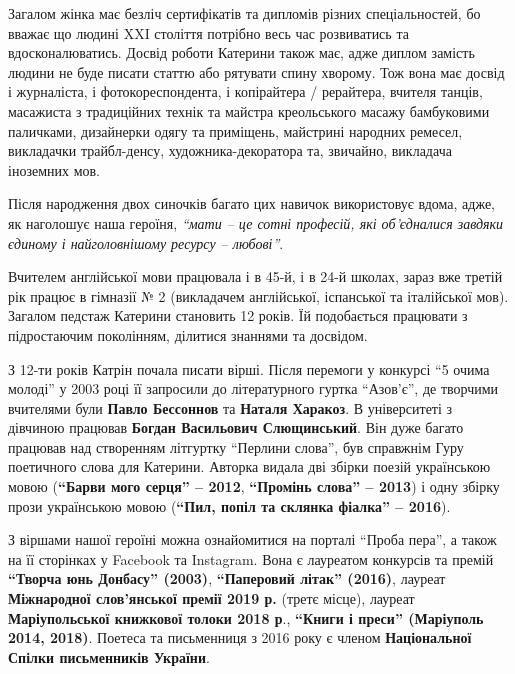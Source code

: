 
Загалом жінка має безліч сертифікатів та дипломів різних спеціальностей, бо
вважає що людині XXI століття потрібно весь час розвиватись та
вдосконалюватись. Досвід роботи Катерини також має, адже диплом замість людини
не буде писати статтю або рятувати спину хворому. Тож вона має досвід і
журналіста, і фотокореспондента, і копірайтера / рерайтера, вчителя танців,
масажиста з традиційних технік та майстра креольського масажу бамбуковими
паличками, дизайнерки одягу та приміщень, майстрині народних ремесел,
викладачки трайбл-денсу, художника-декоратора та, звичайно, викладача іноземних
мов.

Після народження двох синочків багато цих навичок використовує вдома, адже, як
наголошує наша героїня, \emph{\enquote{мати – це сотні професій, які об'єдналися завдяки
єдиному і найголовнішому ресурсу – любові}}.

Вчителем англійської мови працювала і в 45-й, і в 24-й школах, зараз вже третій
рік працює в гімназії № 2 (викладачем англійської, іспанської та італійської
мов). Загалом педстаж Катерини становить 12 років. Їй подобається працювати з
підростаючим поколінням, ділитися знаннями та досвідом. 


З 12-ти років Катрін почала писати вірші. Після перемоги у конкурсі \enquote{5 очима
молоді} у 2003 році її запросили до літературного гуртка \enquote{Азов'є}, де творчими
вчителями були \textbf{Павло Бессоннов} та \textbf{Наталя Харакоз}. В університеті з дівчиною
працював \textbf{Богдан Васильович Слющинський}. Він дуже багато працював над створенням
літгуртку \enquote{Перлини слова}, був справжнім Гуру поетичного слова для Катерини.
Авторка видала дві збірки поезій українською мовою (\textbf{\enquote{Барви мого серця} – 2012},
\textbf{\enquote{Промінь слова} – 2013}) і одну збірку прози українською мовою (\textbf{\enquote{Пил, попіл та
склянка фіалка} – 2016}).

З віршами нашої героїні можна ознайомитися на порталі \enquote{Проба пера}, а також на
її сторінках у Facebook та Instagram. Вона є лауреатом конкурсів та премій
\textbf{\enquote{Творча юнь Донбасу} (2003)}, \textbf{\enquote{Паперовий літак} (2016)}, лауреат \textbf{Міжнародної
слов'янської премії 2019 р.} (третє місце), лауреат \textbf{Маріупольської книжкової
толоки 2018 р}., \textbf{\enquote{Книги і преси} (Маріуполь 2014, 2018)}. Поетеса та письменниця
з 2016 року є членом \textbf{Національної Спілки письменників України}.


